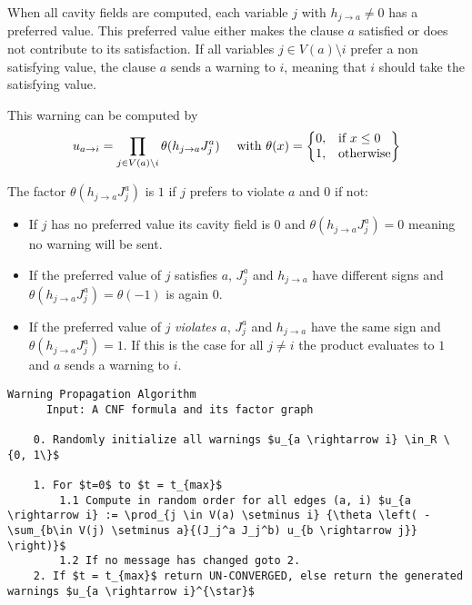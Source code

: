 When all cavity fields are computed, each variable $j$ with $h_{j \rightarrow a} \neq 0$ has a preferred value. This preferred value either makes the clause $a$ satisfied or does not contribute to its satisfaction. If all variables $j \in V(a)\setminus i$ prefer a non satisfying value, the clause $a$ sends a warning to $i$, meaning that $i$ should take the satisfying value.

This warning can be computed by $$u_{a \rightarrow i} = \prod_{j\in V(a)\setminus i}{\theta(h_{j \rightarrow a}J_j^a)} \quad \text{ with } \theta(x) = \left\{
  \begin{array}{@{}ll@{}}
    0, & \text{if}\ x \leq 0 \\
    1, & \text{otherwise}
  \end{array}\right\}$$

The factor $\theta(h_{j \rightarrow a}J_j^a)$ is $1$ if $j$ prefers to violate $a$ and $0$ if not:
\begin{itemize}
\item[] If $j$ has no preferred value its cavity field is $0$ and $\theta(h_{j \rightarrow a}J_j^a) = 0$ meaning no warning will be sent.
\item[] If the preferred value of $j$ satisfies $a$, $J_j^a$ and $h_{j \rightarrow a}$ have different signs and \newline $\theta(h_{j \rightarrow a}J_j^a) = \theta(-1)$ is again $0$.
\item[] If the preferred value of $j$ \emph{violates} $a$, $J_j^a$ and $h_{j \rightarrow a}$ have the same sign and $\theta(h_{j \rightarrow a}J_j^a) = 1$. If this is the case for all $j \neq i$ the product evaluates to $1$ and $a$ sends a warning to $i$.
\end{itemize}
\begin{lstlisting}[mathescape=true, frame = single]
	Warning Propagation Algorithm
	  Input: A CNF formula and its factor graph
	
	0. Randomly initialize all warnings $u_{a \rightarrow i} \in_R \{0, 1\}$
	
	1. For $t=0$ to $t = t_{max}$
		1.1 Compute in random order for all edges (a, i) $u_{a \rightarrow i} := \prod_{j \in V(a) \setminus i} {\theta \left( -\sum_{b\in V(j) \setminus a}{(J_j^a J_j^b) u_{b \rightarrow j}}  \right)}$
		1.2 If no message has changed goto 2.
	2. If $t = t_{max}$ return UN-CONVERGED, else return the generated warnings $u_{a \rightarrow i}^{\star}$
\end{lstlisting}

